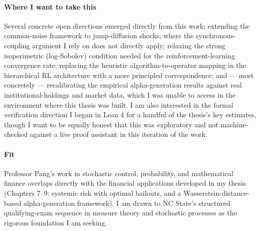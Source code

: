 \documentclass[11pt]{article}
\begin{document}
\paragraph{Where I want to take this} Several concrete open directions emerged directly from this
work: extending the common-noise framework to jump-diffusion shocks, where the
synchronous-coupling argument I rely on does not directly apply; relaxing the strong isoperimetric
(log-Sobolev) condition needed for the reinforcement-learning convergence rate; replacing the
heuristic algorithm-to-operator mapping in the hierarchical RL architecture with a more principled
correspondence; and --- most concretely --- recalibrating the empirical alpha-generation results
against real institutional-holdings and market data, which I was unable to access in the
environment where this thesis was built. I am also interested in the formal verification direction
I began in Lean 4 for a handful of the thesis's key estimates, though I want to be equally honest
that this was exploratory and not machine-checked against a live proof assistant in this iteration
of the work.

\paragraph{Fit} Professor Pang's work in stochastic control, probability, and mathematical finance
overlaps directly with the financial applications developed in my thesis (Chapters 7--9: systemic
risk with optimal bailouts, and a Wasserstein-distance-based alpha-generation framework). I am
drawn to NC State's structured qualifying-exam sequence in measure theory and stochastic processes
as the rigorous foundation I am seeking.
\end{document}
